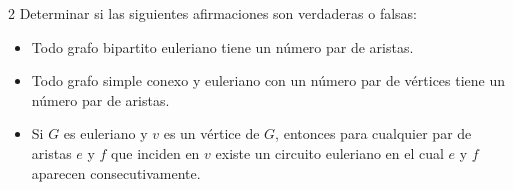 \begin{ejercicioEntregar}{2}
    Determinar si las siguientes afirmaciones son verdaderas o falsas:
    \begin{itemize}
        \item Todo grafo bipartito euleriano tiene un número par de aristas.
        \item Todo grafo simple conexo y euleriano con un número par de vértices tiene un número par de aristas.
        \item Si \( G \) es euleriano y \( v \) es un vértice de \( G \), entonces para cualquier par de aristas \( e \) y \( f \) que inciden en \( v \) existe un circuito euleriano en el cual \( e \) y \( f \) aparecen consecutivamente.
    \end{itemize}
\end{ejercicioEntregar}
